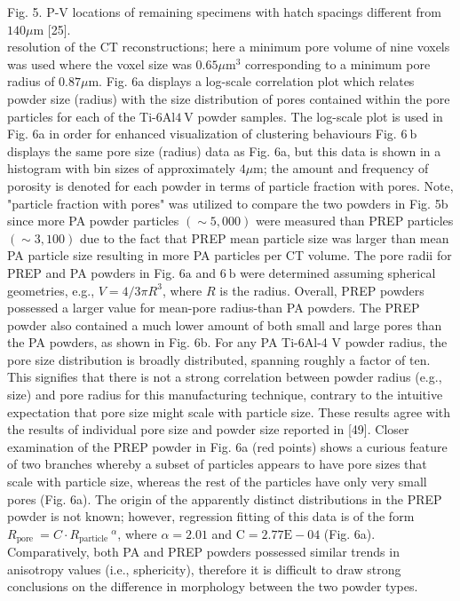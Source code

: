 \documentclass[10pt]{article}
\begin{document}
Fig. 5. P-V locations of remaining specimens with hatch spacings different from $140 \mu \mathrm{m}$ [25].\\
resolution of the CT reconstructions; here a minimum pore volume of nine voxels was used where the voxel size was $0.65 \mu \mathrm{m}^{3}$ corresponding to a minimum pore radius of $0.87 \mu \mathrm{m}$. Fig. 6a displays a log-scale correlation plot which relates powder size (radius) with the size distribution of pores contained within the pore particles for each of the Ti-6Al$4 \mathrm{~V}$ powder samples. The log-scale plot is used in Fig. 6a in order for enhanced visualization of clustering behaviours Fig. $6 \mathrm{~b}$ displays the same pore size (radius) data as Fig. 6a, but this data is shown in a histogram with bin sizes of approximately $4 \mu \mathrm{m}$; the amount and frequency of porosity is denoted for each powder in terms of particle fraction with pores. Note, "particle fraction with pores" was utilized to compare the two powders in Fig. 5b since more PA powder particles $(\sim 5,000)$ were measured than PREP particles $(\sim 3,100)$ due to the fact that PREP mean particle size was larger than mean PA particle size resulting in more PA particles per CT volume. The pore radii for PREP and PA powders in Fig. $6 \mathrm{a}$ and $6 \mathrm{~b}$ were determined assuming spherical geometries, e.g., $V=4 / 3 \pi R^{3}$, where $R$ is the radius. Overall, PREP powders possessed a larger value for mean-pore radius-than PA powders. The PREP powder also contained a much lower amount of both small and large pores than the PA powders, as shown in Fig. 6b. For any PA Ti-6Al-4 V powder radius, the pore size distribution is broadly distributed, spanning roughly a factor of ten. This signifies that there is not a strong correlation between powder radius (e.g., size) and pore radius for this manufacturing technique, contrary to the intuitive expectation that pore size might scale with particle size. These results agree with the results of individual pore size and powder size reported in [49]. Closer examination of the PREP powder in Fig. 6a (red points) shows a curious feature of two branches whereby a subset of particles appears to have pore sizes that scale with particle size, whereas the rest of the particles have only very small pores (Fig. 6a). The origin of the apparently distinct distributions in the PREP powder is not known; however, regression fitting of this data is of the form $R_{\text {pore }}=C \cdot R_{\text {particle }}{ }^{\alpha}$, where $\alpha=2.01$ and $\mathrm{C}=2.77 \mathrm{E}-04$ (Fig. 6a). Comparatively, both PA and PREP powders possessed similar trends in anisotropy values (i.e., sphericity), therefore it is difficult to draw strong conclusions on the difference in morphology between the two powder types.
\end{document}

